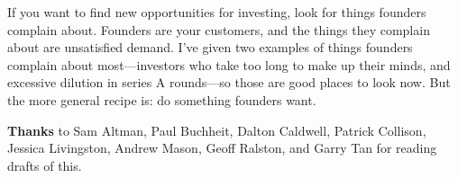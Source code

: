 If you want to find new opportunities for investing, look for things
founders complain about. Founders are your customers, and the things
they complain about are unsatisfied demand. I've given two examples of
things founders complain about most---investors who take too long to
make up their minds, and excessive dilution in series A rounds---so
those are good places to look now. But the more general recipe is: do
something founders want.


\textbf{Thanks} to Sam Altman, Paul Buchheit, Dalton Caldwell, Patrick
Collison, Jessica Livingston, Andrew Mason, Geoff Ralston, and Garry Tan
for reading drafts of this.